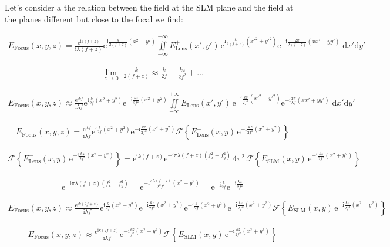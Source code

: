 \documentclass[a4paper,11pt,onecolumn]{scrartcl}
\renewcommand{\i}{\mathrm i}
\newcommand{\e}{\mathrm e}
\begin{document}
Let's consider a the relation between the field at the SLM plane and the field at the planes different but close to the focal we find:

\begin{align}
E_\mathrm{Focus}(x,y,z) = \frac{\mathrm e^{\i k(f+z)}}{\i\lambda (f+z)}\e^{\i\frac{k}{2(f+z)}(x^2+y^2)}\iint\limits_{-\infty}^{+\infty} E_\mathrm{Lens}^+(x', y')\,\e^{\i\frac{k}{2(f+z)}(x'^2 + y'^2)}\e^{-\i\frac{2\pi}{\lambda (f+z)}(xx'+yy')}\;\mathrm dx'\mathrm dy'
\end{align}

\begin{align}
\lim\limits_{z \rightarrow 0}\;\frac{k}{2(f + z)} \approx \frac{k}{2 f} - \frac{kz}{2f^2} + \dots
\end{align}

\begin{align}
E_\mathrm{Focus}(x,y,z) \approx \frac{\mathrm e^{\i kf}}{\i\lambda f}\e^{\i\frac{k}{2f}(x^2+y^2)}\e^{-\i\frac{kz}{2f^2}(x^2+y^2)}\iint\limits_{-\infty}^{+\infty} E_\mathrm{Lens}^-(x', y')\,\e^{-\i\frac{kz}{2f^2}(x'^2 + y'^2)}\e^{-\i\frac{2\pi}{\lambda f}(xx'+yy')}\;\mathrm dx'\mathrm dy'
\end{align}

\begin{align}
E_\mathrm{Focus}(x,y,z) = \frac{\mathrm e^{\i kf}}{\i\lambda f}\e^{\i\frac{k}{2f}(x^2+y^2)}\e^{-\i\frac{kz}{2f^2}(x^2+y^2)}\mathcal F\left\{E_\mathrm{Lens}^-(x, y)\,\e^{-\i\frac{kz}{2f^2}(x^2 + y^2)}\right\}
\end{align}

\begin{align}
\mathcal F\left\{E_\mathrm{Lens}^-(x, y)\,\e^{-\i\frac{kz}{2f^2}(x^2 + y^2)}\right\} = \e^{\i k(f+z)}\e^{-\i\pi\lambda (f+z)(f_x^2+f_y^2)}\,4\pi^2\,\mathcal F\left\{E_\mathrm{SLM}(x, y)\,\e^{-\i\frac{kz}{2f^2}(x^2 + y^2)}\right\}
\end{align}

\begin{align}
\e^{-\i\pi\lambda (f+z)(f_x^2+f_y^2)} = \e^{-\i\frac{\pi\lambda (f+z)}{\lambda^2f^2}(x^2+y^2)} = \e^{-\i\frac{k}{2f}}\e^{-\i\frac{kz}{2f^2}}
\end{align}


\begin{align}
E_\mathrm{Focus}(x,y,z) \approx \frac{\mathrm e^{\i k(2f + z)}}{\i\lambda f}\e^{\i\frac{k}{2f}(x^2+y^2)}\e^{-\i\frac{kz}{2f^2}(x^2+y^2)}\e^{-\i\frac{k}{2f}(x^2+y^2)}\e^{-\i\frac{kz}{2f^2}(x^2+y^2)}\mathcal F\left\{E_\mathrm{SLM}(x, y)\,\e^{-\i\frac{kz}{2f^2}(x^2 + y^2)}\right\}
\end{align}



\begin{align}
\boxed{
E_\mathrm{Focus}(x,y,z) \approx \frac{\mathrm e^{\i k(2f + z)}}{\i\lambda f}\e^{-\i\frac{kz}{f^2}(x^2+y^2)}\mathcal F\left\{E_\mathrm{SLM}(x, y)\,\e^{-\i\frac{kz}{2f^2}(x^2 + y^2)}\right\}
}
\end{align}
\end{document}
